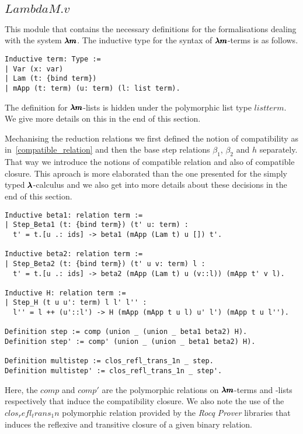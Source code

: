 \subsection{\lst$LambdaM.v$}

This module that contains the necessary definitions for the formalisations dealing with the system $\pmb{\lambda m}$.
The inductive type for the syntax of $\pmb{\lambda m}$-terms is as follows.
\begin{lstlisting}[language=Coq]
Inductive term: Type :=
| Var (x: var)
| Lam (t: {bind term})
| mApp (t: term) (u: term) (l: list term).
\end{lstlisting}

The definition for $\pmb{\lambda m}$-lists is hidden under the polymorphic list type \lst$list term$.
We give more details on this in the end of this section.

Mechanising the reduction relations we first defined the notion of compatibility as in~\cref{compatible_relation} and then the base step relations $\beta_1$, $\beta_2$ and $h$ separately.
That way we introduce the notions of compatible relation and also of compatible closure.
This aproach is more elaborated than the one presented for the simply typed $\pmb{\lambda}$-calculus and we also get into more details about these decisions in the end of this section.

\begin{lstlisting}[language=Coq]
Inductive beta1: relation term :=
| Step_Beta1 (t: {bind term}) (t' u: term) :
  t' = t.[u .: ids] -> beta1 (mApp (Lam t) u []) t'.

Inductive beta2: relation term :=
| Step_Beta2 (t: {bind term}) (t' u v: term) l :
  t' = t.[u .: ids] -> beta2 (mApp (Lam t) u (v::l)) (mApp t' v l).

Inductive H: relation term :=       
| Step_H (t u u': term) l l' l'' :
  l'' = l ++ (u'::l') -> H (mApp (mApp t u l) u' l') (mApp t u l'').

Definition step := comp (union _ (union _ beta1 beta2) H).
Definition step' := comp' (union _ (union _ beta1 beta2) H).

Definition multistep := clos_refl_trans_1n _ step.
Definition multistep' := clos_refl_trans_1n _ step'.
\end{lstlisting}

Here, the \lst$comp$ and \lst$comp'$ are the polymorphic relations on $\pmb{\lambda m}$-terms and -lists respectively that induce the compatibility closure.
We also note the use of the \lst$clos_refl_trans_1n$ polymorphic relation provided by the \textit{Rocq Prover} libraries that induces the reflexive and transitive closure of a given binary relation.

